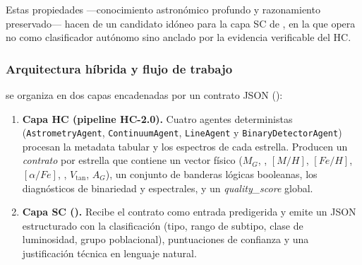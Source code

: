 Estas propiedades ---conocimiento astronómico profundo y razonamiento preservado---
hacen de \AstroSage{} un candidato idóneo para la capa SC de \STELLAR{}, en la que
opera no como clasificador autónomo sino anclado por la evidencia verificable del HC.

\subsubsection{Arquitectura híbrida y flujo de trabajo}
\label{sec:metodo-arquitectura}

\STELLAR{} se organiza en dos capas encadenadas por un contrato JSON
():

\begin{enumerate}
  \item \textbf{Capa HC (pipeline HC-2.0).} Cuatro agentes deterministas
  (\texttt{AstrometryAgent}, \texttt{ContinuumAgent}, \texttt{LineAgent} y
  \texttt{BinaryDetectorAgent}) procesan la metadata tabular y los espectros
  de cada estrella. Producen un \emph{contrato} por estrella que contiene un
  vector físico ($M_G$, \teff{}, $[M/H]$, $[Fe/H]$, $[\alpha/Fe]$, \logg{},
  $V_\mathrm{tan}$, $A_G$), un conjunto de banderas lógicas booleanas, los
  diagnósticos de binariedad y espectrales, y un \emph{quality\_score} global.
  \item \textbf{Capa SC (\AstroSage{}).} Recibe el contrato como entrada
  predigerida y emite un JSON estructurado con la clasificación (tipo, rango de
  subtipo, clase de luminosidad, grupo poblacional), puntuaciones de confianza y
  una justificación técnica en lenguaje natural.
\end{enumerate}

